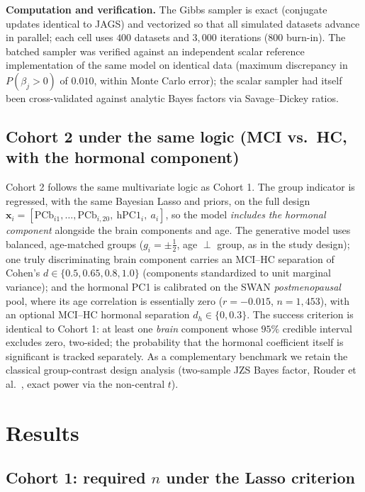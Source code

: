 \documentclass[11pt,a4paper]{article}
\begin{document}
\textbf{Computation and verification.} The Gibbs sampler is exact (conjugate updates identical to JAGS) and vectorized so that all simulated datasets advance in parallel; each cell uses $400$ datasets and $3{,}000$ iterations ($800$ burn-in). The batched sampler was verified against an independent scalar reference implementation of the same model on identical data (maximum discrepancy in $P(\beta_j>0)$ of $0.010$, within Monte Carlo error); the scalar sampler had itself been cross-validated against analytic Bayes factors via Savage--Dickey ratios.

\subsection{Cohort 2 under the same logic (MCI vs.\ HC, with the hormonal component)}

Cohort 2 follows the same multivariate logic as Cohort 1. The group indicator is regressed, with the same Bayesian Lasso and priors, on the full design $\mathbf{x}_i=[\mathrm{PCb}_{i1},\dots,\mathrm{PCb}_{i,20},\ \mathrm{hPC1}_i,\ a_i]$, so the model \emph{includes the hormonal component} alongside the brain components and age. The generative model uses balanced, age-matched groups ($g_i=\pm\tfrac12$, age $\perp$ group, as in the study design); one truly discriminating brain component carries an MCI--HC separation of Cohen's $d\in\{0.5, 0.65, 0.8, 1.0\}$ (components standardized to unit marginal variance); and the hormonal PC1 is calibrated on the SWAN \emph{postmenopausal} pool, where its age correlation is essentially zero ($r=-0.015$, $n=1{,}453$), with an optional MCI--HC hormonal separation $d_h\in\{0, 0.3\}$. The success criterion is identical to Cohort 1: at least one \emph{brain} component whose $95\%$ credible interval excludes zero, two-sided; the probability that the hormonal coefficient itself is significant is tracked separately. As a complementary benchmark we retain the classical group-contrast design analysis (two-sample JZS Bayes factor, Rouder et al.\ \cite{rouder2009}, exact power via the non-central $t$).

\section{Results}

\subsection{Cohort 1: required $n$ under the Lasso criterion}
\end{document}
